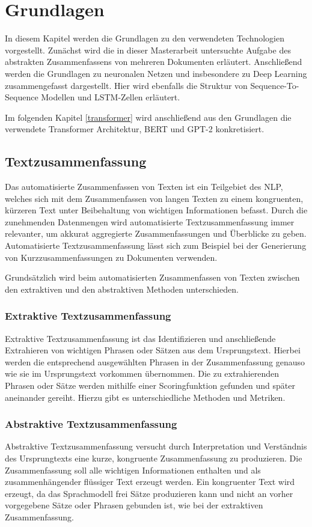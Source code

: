 \section{Grundlagen}\raggedbottom
In diesem Kapitel werden die Grundlagen zu den verwendeten Technologien vorgestellt. 
Zunächst wird die in dieser Masterarbeit untersuchte Aufgabe des abstrakten Zusammenfassens von mehreren Dokumenten erläutert.
Anschließend werden die Grundlagen zu neuronalen Netzen und insbesondere zu Deep Learning zusammengefasst dargestellt. 
Hier wird ebenfalls die Struktur von Sequence-To-Sequence Modellen und LSTM-Zellen erläutert.

Im folgenden Kapitel \ref*{transformer} wird anschließend aus den Grundlagen die verwendete Transformer Architektur, BERT und GPT-2 konkretisiert.


\subsection{Textzusammenfassung}
Das automatisierte Zusammenfassen von Texten ist ein Teilgebiet des NLP, welches sich mit dem Zusammenfassen von langen Texten zu einem kongruenten, kürzeren Text unter Beibehaltung von wichtigen Informationen befasst. 
Durch die zunehmenden Datenmengen wird automatisierte Textzusammenfassung immer relevanter, um akkurat aggregierte Zusammenfassungen und Überblicke zu geben.
Automatisierte Textzusammenfassung lässt sich zum Beispiel bei der Generierung von Kurzzusammenfassungen zu Dokumenten verwenden.

Grundsätzlich wird beim automatisierten Zusammenfassen von Texten zwischen den extraktiven und den abstraktiven Methoden unterschieden.

\subsubsection{Extraktive Textzusammenfassung}
Extraktive Textzusammenfassung ist das Identifizieren und anschließende Extrahieren von wichtigen Phrasen oder Sätzen aus dem Ursprungstext.
Hierbei werden die entsprechend ausgewählten Phrasen in der Zusammenfassung genauso wie sie im Ursprungstext vorkommen übernommen.
Die zu extrahierenden Phrasen oder Sätze werden mithilfe einer Scoringfunktion gefunden und später aneinander gereiht. Hierzu gibt es unterschiedliche Methoden und Metriken.

\subsubsection{Abstraktive Textzusammenfassung}
Abstraktive Textzusammenfassung versucht durch Interpretation und Verständnis des Ursprungtexts eine kurze, kongruente Zusammenfassung zu produzieren. 
Die Zusammenfassung soll alle wichtigen Informationen enthalten und als zusammenhängender flüssiger Text erzeugt werden. Ein kongruenter Text wird erzeugt, da das Sprachmodell frei Sätze produzieren kann und nicht an vorher vorgegebene Sätze oder Phrasen gebunden ist, wie bei der extraktiven Zusammenfassung.

